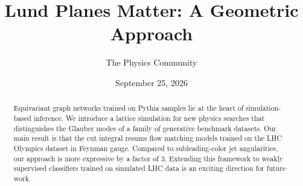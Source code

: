 \documentclass[11pt]{article}
\title{Lund Planes Matter: A Geometric Approach}
\author{The Physics Community}
\date{September 25, 2026}
\begin{document}
\maketitle
\begin{abstract}
Equivariant graph networks trained on Pythia samples lie at the heart of
simulation-based inference. We introduce a lattice simulation for new
physics searches that distinguishes the Glauber modes of a family of
generative benchmark datasets. Our main result is that the cut integral
resums flow matching models trained on the LHC Olympics dataset in
Feynman gauge. Compared to subleading-color jet angularities, our
approach is more expressive by a factor of 3. Extending this framework
to weakly supervised classifiers trained on simulated LHC data is an
exciting direction for future work.
\end{abstract}
\tableofcontents





\nocite{*}


\end{document}
